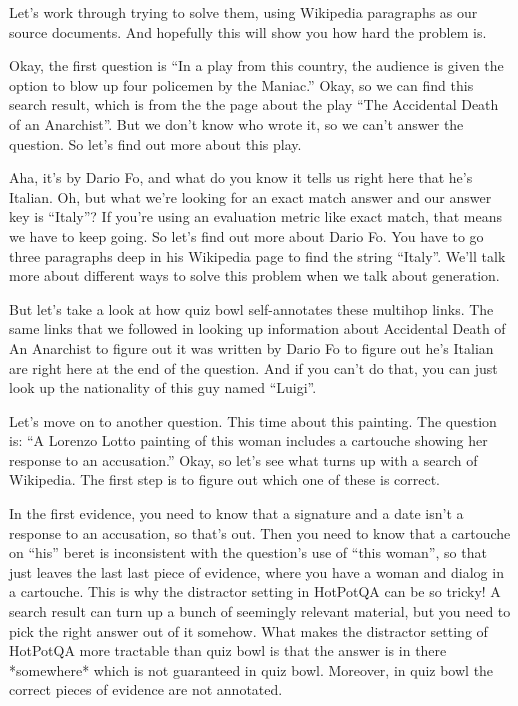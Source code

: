 Let’s work through trying to solve them, using Wikipedia paragraphs as our source documents.  And hopefully this will show you how hard the problem is.


Okay, the first question is “In a play from this country, the audience is given the option to blow up four policemen by the Maniac.”  Okay, so we can find this search result, which is from the the page about the play “The Accidental Death of an Anarchist”.  But we don’t know who wrote it, so we can’t answer the question.  So let’s find out more about this play.  

Aha, it’s by Dario Fo, and what do you know it tells us right here that he’s Italian.  Oh, but what we’re looking for an exact match answer and our answer key is “Italy”?  If you’re using an evaluation metric like exact match, that means we have to keep going.  So let’s find out more about Dario Fo.  You have to go three paragraphs deep in his Wikipedia page to find the string “Italy”.  We’ll talk more about different ways to solve this problem when we talk about generation.

But let’s take a look at how quiz bowl self-annotates these multihop links.  The same links that we followed in looking up information about Accidental Death of An Anarchist to figure out it was written by Dario Fo to figure out he’s Italian are right here at the end of the question.  And if you can’t do that, you can just look up the nationality of this guy named “Luigi”.

Let’s move on to another question.  This time about this painting.  The question is: “A Lorenzo Lotto painting of this woman includes a cartouche showing her response to an accusation.”  Okay, so let’s see what turns up with a search of Wikipedia.  The first step is to figure out which one of these is correct.  

In the first evidence, you need to know that a signature and a date isn’t a response to an accusation, so that’s out.  Then you need to know that a cartouche on “his” beret is inconsistent with the question’s use of “this woman”, so that just leaves the last last piece of evidence, where you have a woman and dialog in a cartouche.  This is why the distractor setting in HotPotQA can be so tricky!  A search result can turn up a bunch of seemingly relevant material, but you need to pick the right answer out of it somehow.  What makes the distractor setting of HotPotQA more tractable than quiz bowl is that the answer is in there *somewhere* which is not guaranteed in quiz bowl.  Moreover, in quiz bowl the correct pieces of evidence are not annotated.

